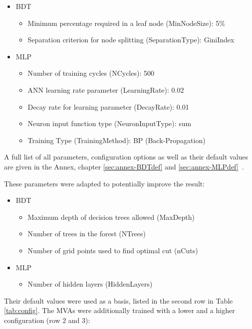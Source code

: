 \documentclass[11pt]{scrartcl}
\begin{document}
		\begin{itemize}
  			\item BDT
  					\begin{itemize}
  					\item Minimum percentage required in a leaf node (MinNodeSize): 5\%
  					\item Separation criterion for node splitting (SeparationType): GiniIndex
  					\end{itemize}
  		  	\item MLP
  					\begin{itemize}
  					\item Number of training cycles (NCycles): 500
  					\item ANN learning rate parameter (LearningRate): 0.02
  					\item Decay rate for learning parameter (DecayRate): 0.01
  					\item Neuron input function type (NeuronInputType): sum
  					\item Training Type (TrainingMethod): BP (Back-Propagation)
  					\end{itemize}		
		\end{itemize}
		
	A full list of all parameters, configuration options as well as their default values are given in the Annex, chapter \ref{sec:annex-BDTdef} and \ref{sec:annex-MLPdef}~\cite{TMVA}.
	
	These parameters were adapted to potentially improve the result:
		\begin{itemize}
  			\item BDT
  					\begin{itemize}
  					\item Maximum depth of decision trees allowed (MaxDepth)
  					\item Number of trees in the forest (NTrees)
  					\item Number of grid points used to find optimal cut (nCuts)
  					\end{itemize}
  		  	\item MLP
  					\begin{itemize}
  					\item Number of hidden layers (HiddenLayers)
  					\end{itemize}		
		\end{itemize}
		
	Their default values were used as a basis, listed in the second row in Table \ref{tab:config}. The MVAs were additionally trained with a lower and a higher configuration (row 2 and 3):
	
\end{document}
